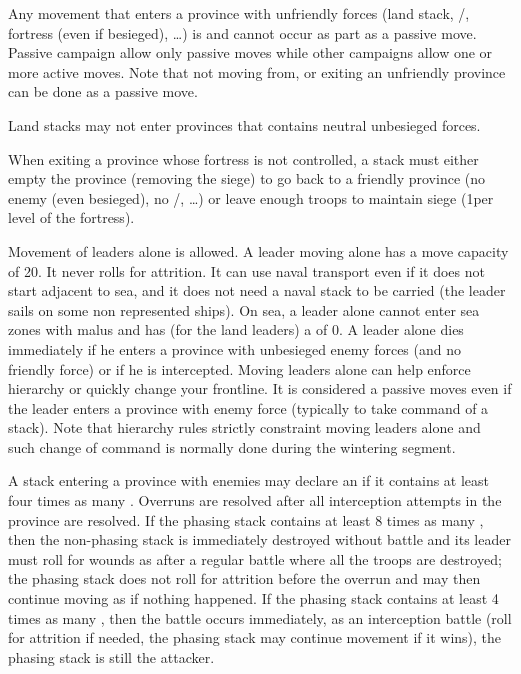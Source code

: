 Any movement that enters a province with unfriendly forces (land stack,
\REVOLT/\REBELLION, fortress (even if besieged), \ldots) is  and
cannot occur as part as a passive move. Passive campaign allow only passive
moves while other campaigns allow one or more active moves. Note that not
moving from, or exiting an unfriendly province can be done as a passive move.

Land stacks may not enter provinces that contains neutral unbesieged forces.

When exiting a province whose fortress is not controlled, a stack must either
empty the province (removing the siege) to go back to a friendly province (no
enemy (even besieged), no \REVOLT/\REBELLION, \ldots) or leave enough troops
to maintain siege (1\LD per level of the fortress).

Movement of leaders alone is allowed. A leader moving alone has a move
capacity of 20\MP. It never rolls for attrition. It can use naval transport
even if it does not start adjacent to sea, and it does not need a naval stack
to be carried (the leader sails on some non represented ships). On sea, a
leader alone cannot enter sea zones with malus and has (for the land leaders)
a \Man of 0. A leader alone dies immediately if he enters a province with
unbesieged enemy forces (and no friendly force) or if he is
intercepted. Moving leaders alone can help enforce hierarchy or quickly change
your frontline. It is considered a passive moves even if the leader enters a
province with enemy force (typically to take command of a stack). Note that
hierarchy rules strictly constraint moving leaders alone and such change of
command is normally done during the wintering segment.

A stack entering a province with enemies may declare an  if it
contains at least four times as many \LD. Overruns are resolved after all
interception attempts in the province are resolved. If the phasing stack
contains at least 8 times as many \LD, then the non-phasing stack is
immediately destroyed without battle and its leader must roll for wounds as
after a regular battle where all the troops are destroyed; the phasing stack
does not roll for attrition before the overrun and may then continue moving as
if nothing happened. If the phasing stack contains at least 4 times as many
\LD, then the battle occurs immediately, as an interception battle (roll for
attrition if needed, the phasing stack may continue movement if it wins), the
phasing stack is still the attacker.


